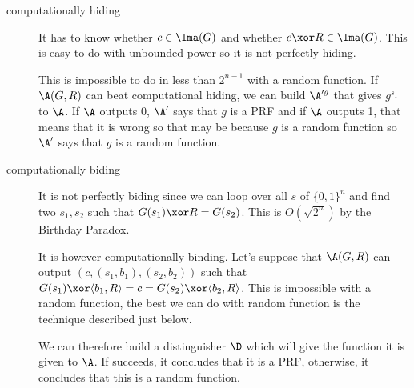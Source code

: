 \begin{solution}
	\begin{description}
		\item[computationally hiding]
		It has to know whether $c \in \Ima(G)$ and whether $c \xor R \in \Ima(G)$.
		This is easy to do with unbounded power so it is not perfectly hiding.
		
		This is impossible to do in less than $2^{n-1}$ with a random function.
		If $\A(G,R)$ can beat computational hiding, we can build $\A'^g$ that gives $g^{s_1}$ to $\A$.
		If $\A$ outputs 0, $\A'$ says that $g$ is a PRF and if $\A$ outputs 1,
		that means that it is wrong so that may be because $g$ is a random function
		so $\A'$ says that $g$ is a random function.
		\item[computationally biding]
		It is not perfectly biding since we can loop over all $s$ of $\{0,1\}^n$ and find two $s_1,s_2$ such
		that $G(s_1) \xor R = G(s_2)$.
		This is $O(\sqrt{2^n})$ by the Birthday Paradox.
		
		It is however computationally binding.
		Let's suppose that $\A(G,R)$ can output $(c, (s_1,b_1), (s_2, b_2))$ such that
		$G(s_1) \xor \langle b_1,R \rangle = c = G(s_2) \xor \langle b_2,R \rangle$.
		This is impossible with a random function, the best we can do with random function is the technique described just below.
		
		We can therefore build a distinguisher $\D$ which will give the function it is given to $\A$.
		If succeeds, it concludes that it is a PRF, otherwise, it concludes that this is a random function.
	\end{description}
\end{solution}


